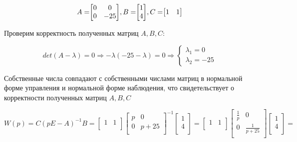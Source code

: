 \documentclass[14pt,a4paper,report]{report}
\begin{document}
\begin{equation*}
\text{$A=$}
\text{$
	\begin{bmatrix}
	0 & 0 \\
	0 & -25 \\
	\end{bmatrix}
	$}
\text{$, B=$}
\text{$
	\begin{bmatrix}
	1 \\
	4 \\
	\end{bmatrix}
	$}
\text{$, C=$}
\text{$
	\begin{bmatrix}
	1 & 1 \\
	\end{bmatrix}
	$}
\end{equation*}

Проверим корректность полученных матриц $A, B, C$:

\begin{equation*}
\text{$det(A-\lambda)=0$}
\Longrightarrow
	\text{$-\lambda(-25-\lambda)=0$}
\Longrightarrow
\begin{cases}
	\text{$\lambda_1=0$} \\
	\text{$\lambda_2=-25$}
\end{cases}
\end{equation*}

Собственные числа совпадают с собственными числами матриц в нормальной форме управления и нормальной форме наблюдения, что свидетельствует о корректности полученных матриц  $A, B, C$

\begin{equation*}
\text{$W(p)=C(pE-A)^{-1}B=
	\begin{bmatrix}
	1 & 1 \\
	\end{bmatrix}
	\begin{bmatrix}
	p & 0 \\
	0 & p+25\\
	\end{bmatrix}^{-1}
	\begin{bmatrix}
	1 \\
	4 \\
	\end{bmatrix}=
	\begin{bmatrix}
	1 & 1 \\
	\end{bmatrix}
	\begin{bmatrix}
	\frac{1}{p} & 0 \\
	0 & \frac{1}{p+25}\\
	\end{bmatrix}
	\begin{bmatrix}
	1 \\
	4 \\
	\end{bmatrix}=
	$}
\end{equation*}
\end{document}
